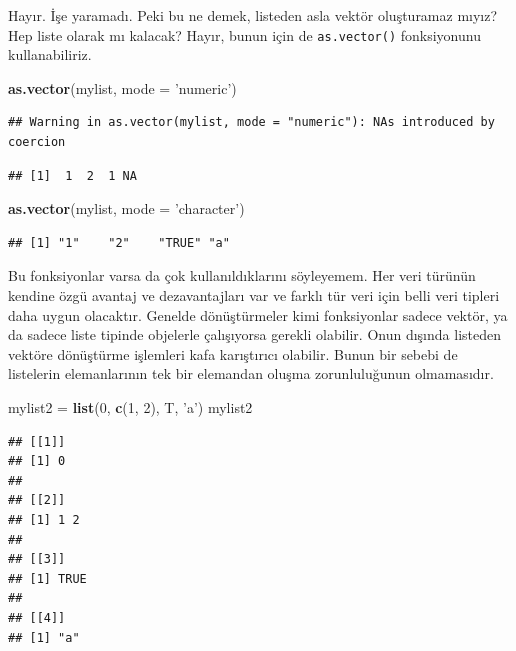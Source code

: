\documentclass[]{book}
\newenvironment{Shaded}{\begin{snugshade}}{\end{snugshade}}
\newcommand{\DataTypeTok}[1]{\textcolor[rgb]{0.13,0.29,0.53}{#1}}
\newcommand{\DecValTok}[1]{\textcolor[rgb]{0.00,0.00,0.81}{#1}}
\newcommand{\KeywordTok}[1]{\textcolor[rgb]{0.13,0.29,0.53}{\textbf{#1}}}
\newcommand{\NormalTok}[1]{#1}
\newcommand{\StringTok}[1]{\textcolor[rgb]{0.31,0.60,0.02}{#1}}
\begin{document}
Hayır. İşe yaramadı. Peki bu ne demek, listeden asla vektör oluşturamaz
mıyız? Hep liste olarak mı kalacak? Hayır, bunun için de
\texttt{as.vector()} fonksiyonunu kullanabiliriz.

\begin{Shaded}
\begin{Highlighting}[]
\KeywordTok{as.vector}\NormalTok{(mylist, }\DataTypeTok{mode =} \StringTok{'numeric'}\NormalTok{)}
\end{Highlighting}
\end{Shaded}

\begin{verbatim}
## Warning in as.vector(mylist, mode = "numeric"): NAs introduced by coercion
\end{verbatim}

\begin{verbatim}
## [1]  1  2  1 NA
\end{verbatim}

\begin{Shaded}
\begin{Highlighting}[]
\KeywordTok{as.vector}\NormalTok{(mylist, }\DataTypeTok{mode =} \StringTok{'character'}\NormalTok{)}
\end{Highlighting}
\end{Shaded}

\begin{verbatim}
## [1] "1"    "2"    "TRUE" "a"
\end{verbatim}

Bu fonksiyonlar varsa da çok kullanıldıklarını söyleyemem. Her veri
türünün kendine özgü avantaj ve dezavantajları var ve farklı tür veri
için belli veri tipleri daha uygun olacaktır. Genelde dönüştürmeler kimi
fonksiyonlar sadece vektör, ya da sadece liste tipinde objelerle
çalışıyorsa gerekli olabilir. Onun dışında listeden vektöre dönüştürme
işlemleri kafa karıştırıcı olabilir. Bunun bir sebebi de listelerin
elemanlarının tek bir elemandan oluşma zorunluluğunun olmamasıdır.

\begin{Shaded}
\begin{Highlighting}[]
\NormalTok{mylist2 =}\StringTok{ }\KeywordTok{list}\NormalTok{(}\DecValTok{0}\NormalTok{, }\KeywordTok{c}\NormalTok{(}\DecValTok{1}\NormalTok{, }\DecValTok{2}\NormalTok{), T, }\StringTok{'a'}\NormalTok{)}
\NormalTok{mylist2}
\end{Highlighting}
\end{Shaded}

\begin{verbatim}
## [[1]]
## [1] 0
## 
## [[2]]
## [1] 1 2
## 
## [[3]]
## [1] TRUE
## 
## [[4]]
## [1] "a"
\end{verbatim}
\end{document}
